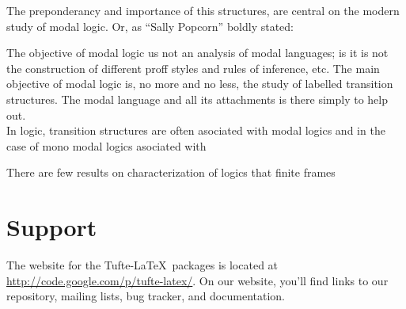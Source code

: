 \documentclass{tufte-handout}
\begin{document}
The preponderancy and importance of this structures, are central on the modern study of modal  logic. Or, as ``Sally Popcorn'' boldly stated:

The objective of modal logic us not an analysis of modal languages; is it is not the construction of different proff styles and rules of inference, etc. The main objective of modal logic is, no more and no less, the study of labelled transition structures. The modal language and all its attachments is there simply to help out.\\



In logic, transition structures are often asociated with modal logics and in the case of mono modal logics asociated with

There are few results on characterization of logics that finite frames



\section{Support}\label{sec:support}

The website for the Tufte-\LaTeX\ packages is located at
\url{http://code.google.com/p/tufte-latex/}.  On our website, you'll find
links to our  repository, mailing lists, bug tracker, and documentation.



\end{document}
